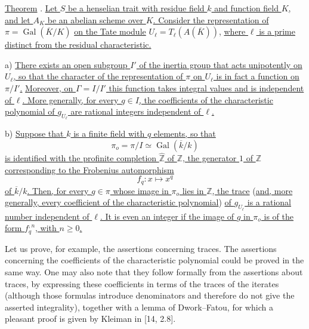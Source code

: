 
\medskip
\noindent
\underline{Theorem} . \underline{Let $S$ be a henselian trait with
residue field $k$ and function field $K$, and let $A_K$ be an abelian
scheme over $K$.  Consider the representation of}
$\pi=\operatorname{Gal}(\overline K/K)$ \underline{on the Tate module}
$U_\ell=T_\ell(A(\overline K))$, \underline{where $\ell$ is a prime
distinct from the residual characteristic.}

\smallskip
\noindent
a) \underline{There exists an open subgroup $I'$ of the inertia group
that acts unipotently on $U_\ell$, so that the character of the
representation of $\pi$ on $U_\ell$ is in fact a function on $\pi/I'$.}
\underline{Moreover, on $\Gamma=I/I'$ this function takes integral
values and is independent of $\ell$.  More generally, for every $g\in I$,
the coefficients of the characteristic polynomial of $g_{U_\ell}$ are
rational integers independent of $\ell$.}

\smallskip
\noindent
b) \underline{Suppose that $k$ is a finite field with $q$ elements, so
that}
\[
 \pi_o=\pi/I\simeq\operatorname{Gal}(\overline k/k)
\]
\underline{is identified with the profinite completion $\widehat{\mathbb
Z}$ of $\mathbb Z$, the generator $1$ of $\mathbb Z$ corresponding to
the Frobenius automorphism}
\[
 f_q:x\longmapsto x^q
\]
\underline{of $\overline k/k$.  Then, for every $g\in\pi$ whose image in
$\pi_o$ lies in $\mathbb Z$, the trace} (\underline{and, more generally, every
coefficient of the characteristic polynomial}) \underline{of $g_{U_\ell}$ is a
rational number independent of $\ell$.  It is even an integer if the
image of $g$ in $\pi_o$ is of the form $f_q^{,n}$, with $n\geq0$.}

Let us prove, for example, the assertions concerning traces.  The
assertions concerning the coefficients of the characteristic polynomial
could be proved in the same way.  One may also note that they follow
formally from the assertions about traces, by expressing these
coefficients in terms of the traces of the iterates (although those
formulas introduce denominators and therefore do not give the asserted
integrality), together with a lemma of Dwork--Fatou, for which a pleasant
proof is given by Kleiman in [14, 2.8].

